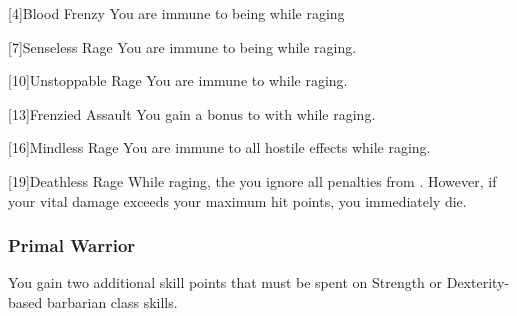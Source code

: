             [4]{Blood Frenzy}
            You are immune to being  while raging

            [7]{Senseless Rage}
            You are immune to being  while raging.

            [10]{Unstoppable Rage}
            You are immune to   while raging.

            [13]{Frenzied Assault}
            You gain a  bonus to  with  while raging.

            [16]{Mindless Rage} 
            You are immune to all hostile  effects while raging.

            [19]{Deathless Rage} 
            While raging, the you ignore all penalties from .
            However, if your vital damage exceeds your maximum hit points, you immediately die.

        \subsubsection{Primal Warrior}
             You gain two additional skill points that must be spent on Strength or Dexterity-based barbarian class skills.

